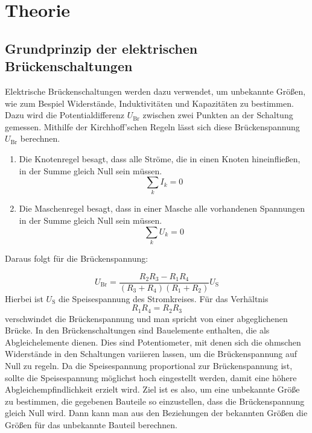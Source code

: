\section{Theorie} \label{sec:Theorie}

\subsection{Grundprinzip der elektrischen Brückenschaltungen}

   Elektrische Brückenschaltungen werden dazu verwendet, um unbekannte Größen, wie zum Bespiel Widerstände, Induktivitäten und
   Kapazitäten zu bestimmen.
   Dazu wird die Potentialdifferenz $U_\text{Br}$ zwischen zwei Punkten an der Schaltung gemessen.
   Mithilfe der Kirchhoff'schen Regeln lässt sich diese Brückenspannung $U_\text{Br}$ berechnen.
   \begin{enumerate}
       \item Die Knotenregel besagt, dass alle Ströme, die in einen Knoten hineinfließen, in der Summe gleich Null sein müssen.
       \begin{equation}
           \sum_k I_k = 0
       \end{equation}
       \item Die Maschenregel besagt, dass in einer Masche alle vorhandenen Spannungen in der Summe gleich Null sein müssen.
       \begin{equation}
           \sum_k U_k = 0
       \end{equation}
   \end{enumerate}


   Daraus folgt für die Brückenspannung:

   \begin{equation}
       U_\text{Br} = \frac{R_2R_3 - R_1R_4}{(R_3 + R_4)(R_1 + R_2)} U_\text{S}
   \end{equation}
   Hierbei ist $U_\text{S}$ die Speisespannung des Stromkreises.
   Für das Verhältnis
   \begin{equation}
       R_1R_4 = R_2R_3 \label{eqn: Widerstände}
   \end{equation}
   verschwindet die Brückenspannung und man spricht von einer abgeglichenen Brücke.
   In den Brückenschaltungen sind Bauelemente enthalten, die als Abgleichelemente dienen.
   Dies sind Potentiometer, mit denen sich die ohmschen Widerstände in den Schaltungen variieren lassen, um
   die Brückenspannung auf Null zu regeln.
   Da die Speisespannung proportional zur Brückenspannung ist, sollte die Speisespannung möglichst hoch eingestellt werden,
   damit eine höhere Abgleichempfindlichkeit erzielt wird.
   Ziel ist es also, um eine unbekannte Größe zu bestimmen, die gegebenen Bauteile so einzustellen, dass
   die Brückenspannung gleich Null wird. Dann kann man aus den Beziehungen der bekannten Größen die Größen für das unbekannte Bauteil berechnen.

